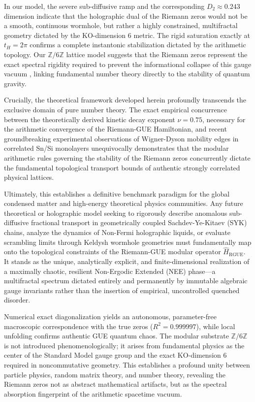 \documentclass[aps,prl,preprint,superscriptaddress,floatfix]{revtex4-2}
\newcommand{\Zmod}{\mathbb{Z}/6\mathbb{Z}}
\begin{document}
In our model, the severe sub-diffusive ramp and the corresponding $D_2 \approx 0.243$ dimension indicate that the holographic dual of the Riemann zeros would not be a smooth, continuous wormhole, but rather a highly constrained, multifractal geometry dictated by the KO-dimension 6 metric. The rigid saturation exactly at $t_H = 2\pi$ confirms a complete instantonic stabilization dictated by the arithmetic topology. Our $\Zmod$ lattice model suggests that the Riemann zeros represent the exact spectral rigidity required to prevent the informational collapse of this gauge vacuum \cite{Connes2008}, linking fundamental number theory directly to the stability of quantum gravity.

Crucially, the theoretical framework developed herein profoundly transcends the exclusive domain of pure number theory. The exact empirical concurrence between the theoretically derived kinetic decay exponent $\nu = 0.75$, necessary for the arithmetic convergence of the Riemann-GUE Hamiltonian, and recent groundbreaking experimental observations of Wigner-Dyson mobility edges in correlated Sn/Si monolayers \cite{Geoffroy2025} unequivocally demonstrates that the modular arithmetic rules governing the stability of the Riemann zeros concurrently dictate the fundamental topological transport bounds of authentic strongly correlated physical lattices.

Ultimately, this establishes a definitive benchmark paradigm for the global condensed matter and high-energy theoretical physics communities. Any future theoretical or holographic model seeking to rigorously describe anomalous sub-diffusive fractional transport in geometrically coupled Sachdev-Ye-Kitaev (SYK) chains, analyze the dynamics of Non-Fermi holographic liquids, or evaluate scrambling limits through Keldysh wormhole geometries must fundamentally map onto the topological constraints of the Riemann-GUE modular operator $\hat{H}_{\text{RGUE}}$. It stands as the unique, analytically explicit, and finite-dimensional realization of a maximally chaotic, resilient Non-Ergodic Extended (NEE) phase—a multifractal spectrum dictated entirely and permanently by immutable algebraic gauge invariants rather than the insertion of empirical, uncontrolled quenched disorder.

Numerical exact diagonalization yields an autonomous, parameter-free macroscopic correspondence with the true zeros ($R^2 = 0.999997$), while local unfolding confirms authentic GUE quantum chaos. The modular substrate $\Zmod$ is not introduced phenomenologically; it arises from fundamental physics as the center of the Standard Model gauge group and the exact KO-dimension 6 required in noncommutative geometry. This establishes a profound unity between particle physics, random matrix theory, and number theory, revealing the Riemann zeros not as abstract mathematical artifacts, but as the spectral absorption fingerprint of the arithmetic spacetime vacuum.
\end{document}
